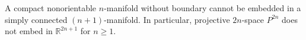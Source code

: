 A compact nonorientable $n$-manifold without boundary cannot be embedded in a simply connected $(n + 1)$-manifold. In particular, projective $2n$-space $P^{2n}$ does not embed in $\mathbb{R}^{2n+1}$ for $n \geqslant 1$.
